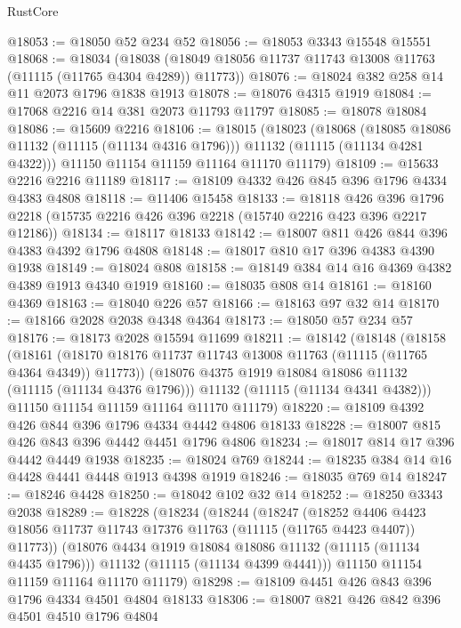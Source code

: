 \begin{lexlean}{RustCore}
\begin{coremodule}
@18053 := @18050 @52 @234 @52
@18056 := @18053 @3343 @15548 @15551
@18068 := @18034
    (@18038 (@18049 @18056 @11737 @11743 @13008 @11763 (@11115 (@11765 @4304 @4289)) @11773))
@18076 := @18024 @382 @258 @14 @11 @2073 @1796 @1838 @1913
@18078 := @18076 @4315 @1919
@18084 := @17068 @2216 @14 @381 @2073 @11793 @11797
@18085 := @18078 @18084
@18086 := @15609 @2216
@18106 := @18015
    (@18023
      (@18068
        (@18085 @18086 @11132 (@11115 (@11134 @4316 @1796)))
        @11132
        (@11115 (@11134 @4281 @4322)))
      @11150
      @11154
      @11159
      @11164
      @11170
      @11179)
@18109 := @15633 @2216 @2216 @11189
@18117 := @18109 @4332 @426 @845 @396 @1796 @4334 @4383 @4808
@18118 := @11406 @15458
@18133 := @18118
    @426
    @396
    @1796
    @2218
    (@15735 @2216 @426 @396 @2218 (@15740 @2216 @423 @396 @2217 @12186))
@18134 := @18117 @18133
@18142 := @18007 @811 @426 @844 @396 @4383 @4392 @1796 @4808
@18148 := @18017 @810 @17 @396 @4383 @4390 @1938
@18149 := @18024 @808
@18158 := @18149 @384 @14 @16 @4369 @4382 @4389 @1913 @4340 @1919
@18160 := @18035 @808 @14
@18161 := @18160 @4369
@18163 := @18040 @226 @57
@18166 := @18163 @97 @32 @14
@18170 := @18166 @2028 @2038 @4348 @4364
@18173 := @18050 @57 @234 @57
@18176 := @18173 @2028 @15594 @11699
@18211 := @18142
    (@18148
      (@18158
        (@18161 (@18170 @18176 @11737 @11743 @13008 @11763 (@11115 (@11765 @4364 @4349)) @11773))
        (@18076 @4375 @1919 @18084 @18086 @11132 (@11115 (@11134 @4376 @1796)))
        @11132
        (@11115 (@11134 @4341 @4382)))
      @11150
      @11154
      @11159
      @11164
      @11170
      @11179)
@18220 := @18109 @4392 @426 @844 @396 @1796 @4334 @4442 @4806 @18133
@18228 := @18007 @815 @426 @843 @396 @4442 @4451 @1796 @4806
@18234 := @18017 @814 @17 @396 @4442 @4449 @1938
@18235 := @18024 @769
@18244 := @18235 @384 @14 @16 @4428 @4441 @4448 @1913 @4398 @1919
@18246 := @18035 @769 @14
@18247 := @18246 @4428
@18250 := @18042 @102 @32 @14
@18252 := @18250 @3343 @2038
@18289 := @18228
    (@18234
      (@18244
        (@18247
          (@18252
            @4406
            @4423
            @18056
            @11737
            @11743
            @17376
            @11763
            (@11115 (@11765 @4423 @4407))
            @11773))
        (@18076 @4434 @1919 @18084 @18086 @11132 (@11115 (@11134 @4435 @1796)))
        @11132
        (@11115 (@11134 @4399 @4441)))
      @11150
      @11154
      @11159
      @11164
      @11170
      @11179)
@18298 := @18109 @4451 @426 @843 @396 @1796 @4334 @4501 @4804 @18133
@18306 := @18007 @821 @426 @842 @396 @4501 @4510 @1796 @4804

\end{coremodule}
\end{lexlean}
